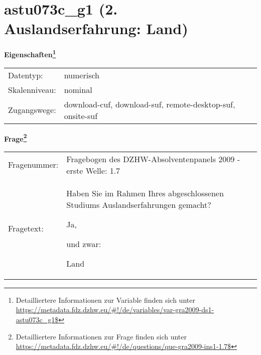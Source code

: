 
    \setcounter{footnote}{0}

    \vspace*{-1.8cm}
	\section{astu073c\_g1 (2. Auslandserfahrung: Land)}
	\label{section:astu073c_g1}



    \vspace*{0.5cm}
    \noindent\textbf{Eigenschaften\footnote{Detailliertere Informationen zur Variable finden sich unter
		\url{https://metadata.fdz.dzhw.eu/\#!/de/variables/var-gra2009-ds1-astu073c_g1$}}}\\
	\begin{tabularx}{\hsize}{@{}lX}
	Datentyp: & numerisch \\
	Skalenniveau: & nominal \\
	Zugangswege: &
	  download-cuf, 
	  download-suf, 
	  remote-desktop-suf, 
	  onsite-suf
 \\
    \end{tabularx}



				\vspace*{0.5cm}
                \noindent\textbf{Frage\footnote{Detailliertere Informationen zur Frage finden sich unter
		              \url{https://metadata.fdz.dzhw.eu/\#!/de/questions/que-gra2009-ins1-1.7$}}}\\
				\begin{tabularx}{\hsize}{@{}lX}
					Fragenummer: &
					  Fragebogen des DZHW-Absolventenpanels 2009 - erste Welle:
					  1.7
 \\
					Fragetext: & Haben Sie im Rahmen Ihres abgeschlossenen Studiums Auslandserfahrungen gemacht?\par  Ja,\par  und zwar:\par  Land \\
				\end{tabularx}





